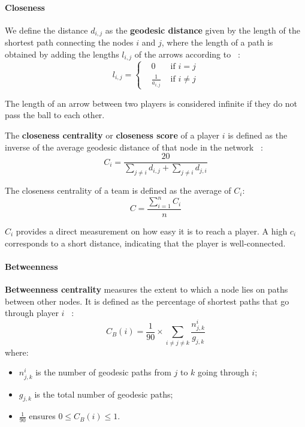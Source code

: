 \documentclass[12pt]{mcmthesis}
\begin{document}
	\paragraph{Closeness}
	We define the distance $d_{i, j}$ as the \textbf{geodesic distance} given by the length of the shortest path connecting the nodes $i$ and $j$, where the length of a path is obtained by adding the lengths $l_{i, j}$ of the arrows according to ~\cite{pena2012network}:
	\begin{equation}\label{eq:dij}
		l_{i, j} = \left\{
		\begin{aligned}
		&0  &\text{ if } i = j\\
		&\frac{1}{a_{i, j}} &\text{ if } i \neq j 
		\end{aligned}
		\right.
	\end{equation}
	
	The length of an arrow between two players is considered infinite if they do not pass the ball to each other.
		
	The \textbf{closeness centrality} or \textbf{closeness score} of a player $i$ is defined as the inverse of the average geodesic distance of that node in the network ~\cite{pena2012network}:
	\begin{equation}\label{eq:closeness1}
		C_{i} = \frac{20}{\sum_{j \neq i} d_{i, j} + \sum_{j \neq i} d_{j, i}}
	\end{equation}
	
	The closeness centrality of a team is defined as the average of $C_{i}$:
	\begin{equation}\label{eq:closeness2}
		C = \frac{\sum_{i = 1}^{n} C_{i}}{n}
	\end{equation}
	
	$C_i$ provides a direct measurement on how easy it is to reach a player. A high $c_i$ corresponds to a short distance, indicating that the player is well-connected.
	
	\paragraph{Betweenness}
	\textbf{Betweenness centrality}	measures the extent to which a node lies on paths between other nodes. It is defined as the percentage of shortest paths that go through player $i$ ~\cite{pena2012network}:
	\begin{equation}\label{eq:between1}
		C_B \left(i\right) = \frac{1}{90} \times \sum_{i \neq j \neq k} \frac{n_{j, k}^i}{g_{j, k}}
	\end{equation}
	where:
	\begin{itemize}
		\item $n_{j, k}^i$ is the number of geodesic paths from $j$ to $k$ going through $i$;
		\item $g_{j, k}$ is the total number of geodesic paths;
		\item $\frac{1}{90}$ ensures $0 \leq C_B \left(i\right) \leq 1$.
	\end{itemize}
	
\end{document}
